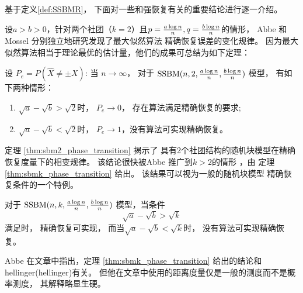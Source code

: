 基于定义\ref{def:SSBMR}，
下面对一些和强恢复有关的重要结论进行逐一介绍。

设$a>b>0$，针对两个社团（$k=2$）且$p=\frac{a \log n}{n},q=\frac{b \log n}{n}$的情形，
Abbe \cite{abbe2015exact} 和 Mossel
\cite{mossel2016} 分别独立地研究发现了最大似然算法
精确恢复误差的变化规律。
因为最大似然算法相当于理论最优的估计量，他们的成果可总结为如下定理：
\begin{theorem}\label{thm:sbm2_phase_transition}
设 $P_e=P(\hat{X} \neq \pm X)$: 当 $n \to \infty$，
对于 $\operatorname{SSBM}(n,2,\frac{a \log n}{n}, \frac{b \log n}{n})$ 模型，
有如下两种情形：
	\begin{enumerate}
		\item $\sqrt{a} - \sqrt{b} > \sqrt{2}$时，
    $P_e \to 0$， 存在算法满足精确恢复的要求;
		\item $\sqrt{a} - \sqrt{b} < \sqrt{2}$时，
    $P_e \to 1$，没有算法可实现精确恢复。
	\end{enumerate}
\end{theorem}
定理 \ref{thm:sbm2_phase_transition} 揭示了
具有2个社团结构的随机块模型在精确恢复度量下的相变规律。
该结论很快被Abbe 推广到$k>2$的情形
\cite{abbe2015community}，由
定理 \ref{thm:sbmk_phase_transition} 给出。
该结果可以视为一般的随机块模型
精确恢复条件的一个特例。

\begin{theorem}\label{thm:sbmk_phase_transition}
  对于 $\operatorname{SSBM}(n,k,\frac{a \log n}{n}, \frac{b \log n}{n})$ 模型，当条件
  \begin{equation}\label{eq:abk}
    \sqrt{a} - \sqrt{b} > \sqrt{k}
  \end{equation}   
  满足时，
  精确恢复可实现，
  而当$\sqrt{a} - \sqrt{b} < \sqrt{k}$时，
  没有算法可实现精确恢复。
\end{theorem}
\begin{remark}
  Abbe 在文章中指出，定理 \ref{thm:sbmk_phase_transition} 
  给出的结论和\gls{hellinger}(\glsdesc{hellinger})有关。
  但他在文章中使用的距离度量仅是一般的测度而不是概率测度，
  其解释略显生硬。
\end{remark}


